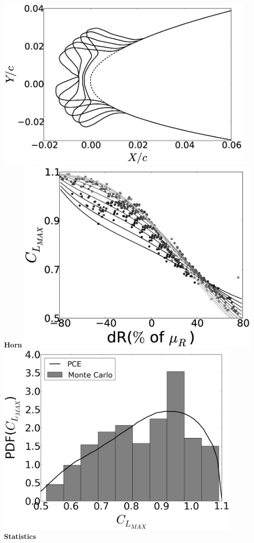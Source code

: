 \documentclass[9pt]{beamer}
\begin{document}
\begin{frame}
\begin{columns}[c]
    \includegraphics[width=0.95\textwidth]{HornSVariation} \\
    {\bf Horn}
    \centering    
    \includegraphics[width=0.9\textwidth]{MC_surrogate_LargeUnc_CL} \\
    \includegraphics[width=0.9\textwidth]{MCgpcPDFLargeUnc_CL} \\
    {\bf Statistics}
\end{columns}


\end{frame}
\end{document}

